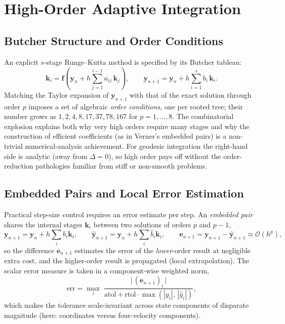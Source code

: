 \documentclass[11pt]{book}
\begin{document}
\section{High-Order Adaptive Integration}
\subsection{Butcher Structure and Order Conditions}
An explicit $s$-stage Runge--Kutta method is specified by its Butcher tableau:
\begin{equation}
    \bm{k}_i = \bm{f}\!\left(\bm{y}_n + h\sum_{j=1}^{i-1} a_{ij}\,\bm{k}_j\right),
    \qquad
    \bm{y}_{n+1} = \bm{y}_n + h\sum_{i=1}^{s} b_i\, \bm{k}_i .
\end{equation}
Matching the Taylor expansion of $\bm{y}_{n+1}$ with that of the exact solution through
order $p$ imposes a set of algebraic \emph{order conditions}, one per rooted tree;
their number grows as $1, 2, 4, 8, 17, 37, 78, 167$ for $p = 1, \dots, 8$. The
combinatorial explosion explains both why very high orders require many stages and why
the construction of efficient coefficients (as in Verner's embedded pairs) is a
non-trivial numerical-analysis achievement. For geodesic integration the right-hand
side is analytic (away from $\Delta = 0$), so high order pays off without the
order-reduction pathologies familiar from stiff or non-smooth problems.

\subsection{Embedded Pairs and Local Error Estimation}
Practical step-size control requires an error estimate per step. An \emph{embedded
pair} shares the internal stages $\bm{k}_i$ between two solutions of orders $p$ and
 $p - 1$,
\begin{equation}
    \bm{y}_{n+1} = \bm{y}_n + h\sum_i b_i \bm{k}_i, \qquad
    \hat{\bm{y}}_{n+1} = \bm{y}_n + h\sum_i \hat{b}_i \bm{k}_i,
    \qquad
    \bm{e}_{n+1} = \bm{y}_{n+1} - \hat{\bm{y}}_{n+1} \approx \mathcal{O}(h^{p}),
\end{equation}
so the difference $\bm{e}_{n+1}$ estimates the error of the \emph{lower}-order result
at negligible extra cost, and the higher-order result is propagated (local
extrapolation). The scalar error measure is taken in a component-wise weighted norm,
\begin{equation}\label{eq:weighted_err}
    \mathrm{err} = \max_i\;
    \frac{\big|\,(\bm{e}_{n+1})_i\,\big|}{\mathrm{atol} + \mathrm{rtol}\cdot
    \max\!\left(|y_i|,\,|\hat{y}_i|\right)} ,
\end{equation}
which makes the tolerance scale-invariant across state components of disparate
magnitude (here: coordinates versus four-velocity components).
\end{document}
